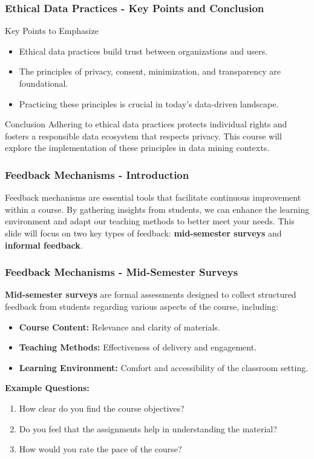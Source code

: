 \documentclass[aspectratio=169]{beamer}
\begin{document}
\begin{frame}[fragile]
    \frametitle{Ethical Data Practices - Key Points and Conclusion}
    \begin{block}{Key Points to Emphasize}
        \begin{itemize}
            \item Ethical data practices build trust between organizations and users.
            \item The principles of privacy, consent, minimization, and transparency are foundational.
            \item Practicing these principles is crucial in today's data-driven landscape.
        \end{itemize}
    \end{block}
    
    \begin{block}{Conclusion}
        Adhering to ethical data practices protects individual rights and fosters a responsible data ecosystem that respects privacy. This course will explore the implementation of these principles in data mining contexts.
    \end{block}
\end{frame}

\begin{frame}[fragile]
    \frametitle{Feedback Mechanisms - Introduction}
    Feedback mechanisms are essential tools that facilitate continuous improvement within a course. By gathering insights from students, we can enhance the learning environment and adapt our teaching methods to better meet your needs. This slide will focus on two key types of feedback: \textbf{mid-semester surveys} and \textbf{informal feedback}.
\end{frame}

\begin{frame}[fragile]
    \frametitle{Feedback Mechanisms - Mid-Semester Surveys}
    \textbf{Mid-semester surveys} are formal assessments designed to collect structured feedback from students regarding various aspects of the course, including:
    
    \begin{itemize}
        \item \textbf{Course Content:} Relevance and clarity of materials.
        \item \textbf{Teaching Methods:} Effectiveness of delivery and engagement.
        \item \textbf{Learning Environment:} Comfort and accessibility of the classroom setting.
    \end{itemize}
    
    \textbf{Example Questions:}
    \begin{enumerate}
        \item How clear do you find the course objectives?
        \item Do you feel that the assignments help in understanding the material?
        \item How would you rate the pace of the course?
    \end{enumerate}
\end{frame}
\end{document}
